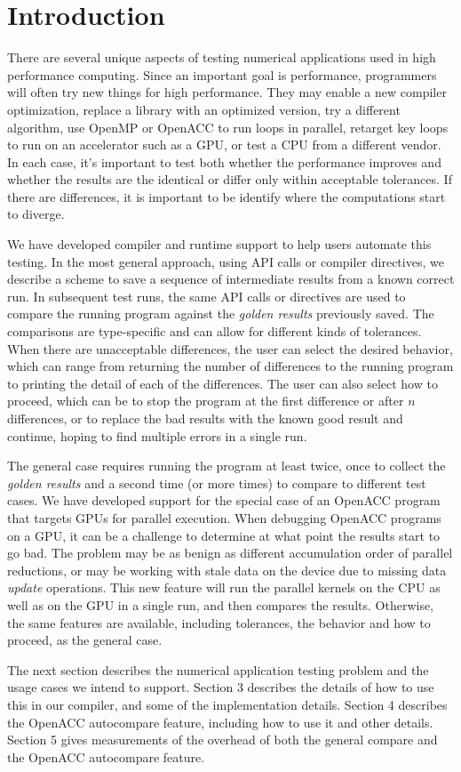 \section{Introduction}

There are several unique aspects of testing numerical applications used in high performance computing.
Since an important goal is performance, programmers will often try new things for high performance.
They may enable a new compiler optimization, replace a library with an optimized version, try a different algorithm, use OpenMP or OpenACC to run loops in parallel, retarget key loops to run on an accelerator such as a GPU, or test a CPU from a different vendor.
In each case, it's important to test both whether the performance improves and whether the results are the identical or differ only within acceptable tolerances.
If there are differences, it is important to be identify where the computations start to diverge.

We have developed compiler and runtime support to help users automate this testing.
In the most general approach, using API calls or compiler directives, we describe a scheme to save a sequence of intermediate results from a known correct run.
In subsequent test runs, the same API calls or directives are used to compare the running program against the \emph{golden results} previously saved.
The comparisons are type-specific and can allow for different kinds of tolerances.
When there are unacceptable differences, the user can select the desired behavior, which can range from returning the number of differences to the running program to printing the detail of each of the differences.
The user can also select how to proceed, which can be to stop the program at the first difference or after $n$ differences, or to replace the bad results with the known good result and continue, hoping to find multiple errors in a single run.

The general case requires running the program at least twice, once to collect the \emph{golden results} and a second time (or more times) to compare to different test cases.
We have developed support for the special case of an OpenACC program that targets GPUs for parallel execution.
When debugging OpenACC programs on a GPU, it can be a challenge to determine at what point the results start to go bad.
The problem may be as benign as different accumulation order of parallel reductions, or may be working with stale data on the device due to missing data \emph{update} operations.
This new feature will run the parallel kernels on the CPU as well as on the GPU in a single run, and then compares the results.
Otherwise, the same features are available, including tolerances, the behavior and how to proceed, as the general case.

The next section describes the numerical application testing problem and the usage cases we intend to support.
Section 3 describes the details of how to use this in our compiler, and some of the implementation details.
Section 4 describes the OpenACC autocompare feature, including how to use it and other details.
Section 5 gives measurements of the overhead of both the general compare and the OpenACC autocompare feature.

